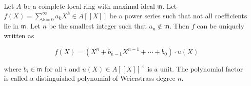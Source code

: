Let $A$ be a complete local ring with maximal ideal $\mathfrak{m}$. Let $f(X) = \sum_{k=0}^{\infty} a_k X^k \in A[[X]]$ be a power series such that not all coefficients lie in $\mathfrak{m}$. Let $n$ be the smallest integer such that $a_n \notin \mathfrak{m}$. Then $f$ can be uniquely written as

$$f(X) = (X^n + b_{n-1}X^{n-1} + \cdots + b_0) \cdot u(X)$$

where $b_i \in \mathfrak{m}$ for all $i$ and $u(X) \in A[[X]]^\times$ is a unit. The polynomial factor is called a distinguished polynomial of Weierstrass degree $n$.
